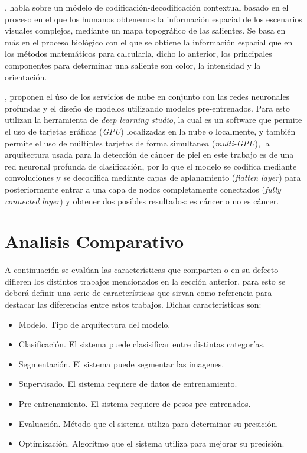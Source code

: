 \citet{KRONER2020261}, habla sobre un módelo de codificación-decodificación contextual basado en el proceso en el que los humanos obtenemos la información espacial de los escenarios visuales complejos, mediante un mapa topográfico de las salientes. Se basa en más en el proceso biológico con el que se obtiene la información espacial que en los métodos matemáticos para calcularla, dicho lo anterior, los principales componentes para determinar una saliente son color, la intensidad y la orientación.  

\citet{KADAMPUR2020100282}, proponen el úso de los servicios de nube en conjunto con las redes neuronales profundas y el diseño de modelos utilizando modelos pre-entrenados. Para esto utilizan la herramienta de \emph{deep learning studio}, la cual es un software que permite el uso de tarjetas gráficas (\emph{GPU}) localizadas en la nube o localmente, y también permite el uso de múltiples tarjetas de forma simultanea (\emph{multi-GPU}), la arquitectura usada para la detección de cáncer de piel en este trabajo es de una red neuronal profunda de clasificación, por lo que el modelo se codifica mediante convoluciones y se decodifica mediante capas de aplanamiento (\emph{flatten layer}) para posteriormente entrar a una capa de nodos completamente conectados (\emph{fully connected layer}) y obtener dos posibles resultados: es cáncer o no es cáncer.



\section{Analisis Comparativo}
A continuación se evalúan las características que comparten o en su defecto difieren los distintos trabajos mencionados en la sección anterior, para esto se deberá definir una serie de características que sirvan como referencia para destacar las diferencias entre estos trabajos. Dichas características son:

\begin{itemize}
    \item Modelo. Tipo de arquitectura del modelo.
    \item Clasificación. El sistema puede clasisificar entre distintas categorías.
    \item Segmentación. El sistema puede segmentar las imagenes.
    \item Supervisado. El sistema requiere de datos de entrenamiento.
    \item Pre-entrenamiento. El sistema requiere de pesos pre-entrenados.
    \item Evaluación. Método que el sistema utiliza para determinar su presición.
    \item Optimización. Algoritmo que el sistema utiliza para mejorar su precisión.
\end{itemize}

